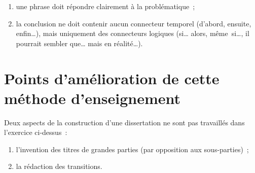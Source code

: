 \documentclass[a4paper,12pt]{report}
\begin{document}
\begin{enumerate}
\item une phrase doit répondre clairement à la problématique ;
\item la conclusion ne doit contenir aucun connecteur temporel (d'abord,
ensuite, enfin\ldots{}), mais uniquement des connecteurs logiques (si\ldots{}
alors, même si\ldots{}, il pourrait sembler que\ldots{} mais en réalité\ldots{}).
\end{enumerate}


\chapter{Points d'amélioration de cette méthode d'enseignement}
\label{sec:org91ed9d0}

Deux aspects de la construction d'une dissertation ne sont pas
travaillés dans l'exercice ci-dessus : 
\begin{enumerate}
\item l'invention des titres de grandes parties (par opposition aux
sous-parties) ;
\item la rédaction des transitions.
\end{enumerate}
\end{document}
